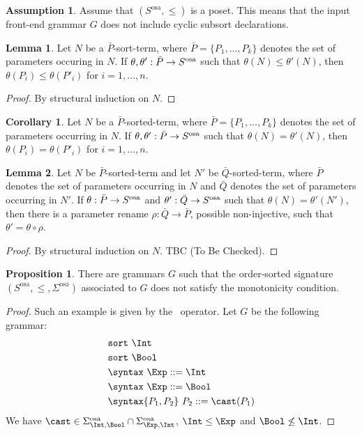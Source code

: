 \documentclass{article}
\theoremstyle{definition}
\theoremstyle{definition}
\newtheorem{assumption}{Assumption}[section]
\theoremstyle{definition}
\theoremstyle{definition}
\theoremstyle{theorem}
\theoremstyle{theorem}
\theoremstyle{theorem}
\newtheorem{lemma}{Lemma}[section]
\theoremstyle{theorem}
\newtheorem{proposition}{Proposition}[section]
\theoremstyle{theorem}
\newtheorem{corollary}{Corollary}[section]
\newcommand{\sort}{\texttt{sort}}
\begin{document}
{\begin{assumption}
Assume that $(S^\textrm{osa},\le)$ is a poset. This means that the input front-end grammar $G$ does not include cyclic subsort declarations.
\end{assumption}

\begin{lemma}\label{lem:leqinst}
Let $N$ be a $\bar{P}$-sort-term, where $\bar{P}=\{P_1,\ldots,P_k\}$ denotes the set of parameters occuring in $N$. If $\theta,\theta':\bar{P}\to S^{\rm osa}$ such that $\theta(N)\le\theta'(N)$, then $\theta(P_i)\le \theta(P'_i)$ for $i=1,\ldots,n$.
\end{lemma}
\begin{proof}
By structural induction on $N$.
\end{proof}
\begin{corollary}
Let $N$ be a $\bar{P}$-sorted-term, where $\bar{P}=\{P_1,\ldots,P_k\}$ denotes the set of parameters occurring in $N$. If $\theta,\theta':\bar{P}\to S^{\rm osa}$ such that $\theta(N) = \theta'(N)$, then $\theta(P_i) = \theta(P'_i)$ for $i=1,\ldots,n$. 
\end{corollary}


\begin{lemma}\label{lem:renaming}
Let $N$ be $\bar{P}$-sorted-term and let $N'$ be $\bar{Q}$-sorted-term, where $\bar{P}$ denotes the set of parameters occurring in $N$ and $\bar{Q}$ denotes the set of parameters occurring in $N'$. 
If $\theta:\bar{P}\to S^{\rm osa}$ and $\theta':\bar{Q}\to S^{\rm osa}$  such that $\theta(N) = \theta'(N')$, then there is a parameter rename $\rho:\bar{Q}\to \bar{P}$, possible non-injective, such that $\theta'=\theta\circ \rho$.
\end{lemma}
\begin{proof}
By structural induction on $N$. TBC (To Be Checked).
\end{proof}


\begin{proposition}\label{prop:non-monoton}
There are grammars $G$ such that the order-sorted signature $(S^\textrm{osa},\le, \Sigma^\textrm{osa})$ associated to $G$ does not satisfy the monotonicity condition.
\end{proposition}
\begin{proof}
Such an example is given by the \cast\ operator. Let $G$ be the following grammar:
\begin{align*}
&\sort\ \Int\\
&\sort\ \Bool\\
&\syntax\ \Exp ::= \Int\\
&\syntax\ \Exp ::= \Bool\\
&\syntax\{P_1,P_2\}\ P_2 ::= \cast(P_1) 
\end{align*}
We have $\cast\in\Sigma^\textrm{osa}_{\Int,\Bool}\cap \Sigma^\textrm{osa}_{\Exp,\Int}$, $\Int\le \Exp$ and $\Bool\not\le \Int$.
\end{proof}

}
\end{document}
